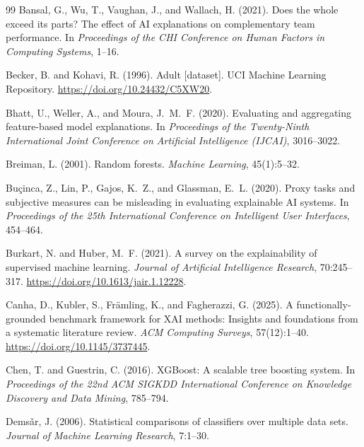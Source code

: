\documentclass[fleqn,10pt,lineno]{wlpeerj}
\begin{document}
\begin{thebibliography}{99}
Bansal, G., Wu, T., Vaughan, J., and Wallach, H. (2021).
Does the whole exceed its parts? The effect of AI explanations on
complementary team performance.
In \emph{Proceedings of the CHI Conference on Human Factors in Computing
Systems}, 1--16.

Becker, B. and Kohavi, R. (1996).
Adult [dataset].
UCI Machine Learning Repository.
\url{https://doi.org/10.24432/C5XW20}.

Bhatt, U., Weller, A., and Moura, J.~M.~F. (2020).
Evaluating and aggregating feature-based model explanations.
In \emph{Proceedings of the Twenty-Ninth International Joint Conference on
Artificial Intelligence (IJCAI)}, 3016--3022.

Breiman, L. (2001).
Random forests.
\emph{Machine Learning}, 45(1):5--32.

Bu\c{c}inca, Z., Lin, P., Gajos, K.~Z., and Glassman, E.~L. (2020).
Proxy tasks and subjective measures can be misleading in evaluating
explainable AI systems.
In \emph{Proceedings of the 25th International Conference on Intelligent
User Interfaces}, 454--464.

Burkart, N. and Huber, M.~F. (2021).
A survey on the explainability of supervised machine learning.
\emph{Journal of Artificial Intelligence Research}, 70:245--317.
\url{https://doi.org/10.1613/jair.1.12228}.

Canha, D., Kubler, S., Fr\"{a}mling, K., and Fagherazzi, G. (2025).
A functionally-grounded benchmark framework for XAI methods: Insights
and foundations from a systematic literature review.
\emph{ACM Computing Surveys}, 57(12):1--40.
\url{https://doi.org/10.1145/3737445}.

Chen, T. and Guestrin, C. (2016).
XGBoost: A scalable tree boosting system.
In \emph{Proceedings of the 22nd ACM SIGKDD International Conference on
Knowledge Discovery and Data Mining}, 785--794.

Dems\v{a}r, J. (2006).
Statistical comparisons of classifiers over multiple data sets.
\emph{Journal of Machine Learning Research}, 7:1--30.


\end{thebibliography}
\end{document}
